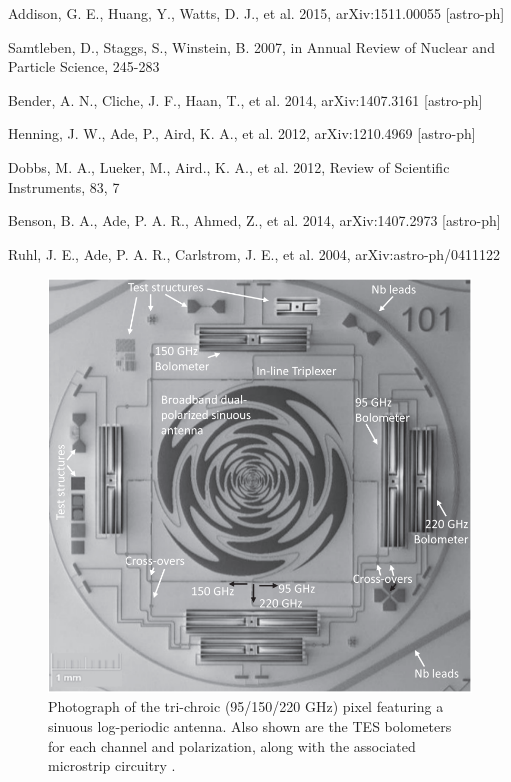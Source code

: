 \documentclass[preprint]{aastex}
\begin{document}
%
\begin{thebibliography}{dummy}
Addison, G. E., Huang, Y., Watts, D. J., et al. 2015, {arXiv:1511.00055 [astro-ph]}

Samtleben, D., Staggs, S., Winstein, B. 2007, in Annual Review of Nuclear and Particle Science, 245-283

Bender, A. N., Cliche, J. F., Haan, T., et al. 2014, {arXiv:1407.3161 [astro-ph]}

Henning, J. W., Ade, P., Aird, K. A., et al. 2012, {arXiv:1210.4969 [astro-ph]}

Dobbs, M. A., Lueker, M., Aird., K. A., et al. 2012, Review of Scientific Instruments, 83, 7

Benson, B. A., Ade, P. A. R., Ahmed, Z., et al. 2014, {arXiv:1407.2973 [astro-ph]}

Ruhl, J. E., Ade, P. A. R., Carlstrom, J. E., et al. 2004, {arXiv:astro-ph/0411122}


	\begin{figure}
		\includegraphics[width=\textwidth]{pixel}
		\centering
		\caption{Photograph of the tri-chroic (95/150/220 GHz) pixel featuring a sinuous log-periodic antenna. Also shown are the TES bolometers for each channel and polarization, along with the associated microstrip circuitry \citep{benson_spt-3g:_2014}.}
		\label{pixel}
	\end{figure}
	

\end{thebibliography}
\end{document}
